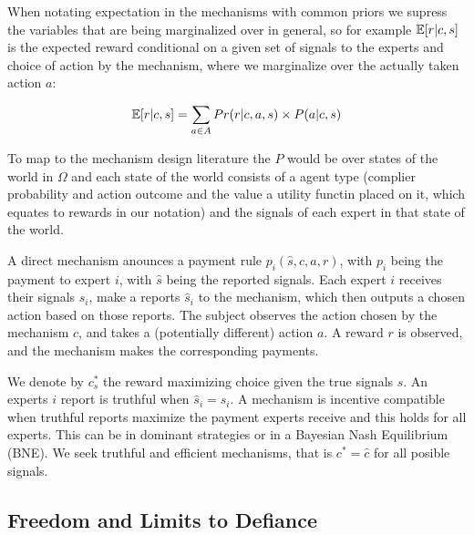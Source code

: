 When notating expectation in the mechanisms with common priors we supress the variables that are being marginalized over in general, so for example $\operatorname*{\mathbb E}[r|c,s]$ is the expected reward conditional on a given set of signals to the experts and choice of action by the mechanism, where we  marginalize over the actually taken action $a$:

\[
\operatorname*{\mathbb E}[r|c,s] = \sum_{a \in A} Pr(r|c,a,s) \times P(a|c,s) 
\]


To map to the mechanism design literature the $P$ would be over states of the world in $\Omega$ and each state of the world consists of a agent type (complier probability and action outcome and the value a utility functin placed on it, which equates to rewards in our notation) and the signals of each expert in that state of the world.



A direct mechanism anounces a payment rule $p_i(\hat{s}, c,a,r)$, with $p_i$ being the payment to expert $i$, with $\hat{s}$ being the reported signals. 
Each expert $i$ receives their signals $s_i$, make a reports $\hat{s}_i$ to the mechanism, which then outputs a chosen action based on those reports.
The subject observes the action chosen by the mechanism $c$, and takes a (potentially different) action $a$. A reward $r$ is observed, and the mechanism makes the corresponding payments.

We denote by $c^{*}_s$ the reward maximizing choice given the true signals $s$.
An experts $i$ report is truthful when $\hat{s}_i=s_i$. A mechanism is incentive compatible when truthful reports maximize the payment experts receive and this holds for all experts. This can be in dominant strategies or in a Bayesian Nash Equilibrium (BNE).  We seek truthful and efficient mechanisms, that is $c^{*} = \hat{c}$ for all posible signals.






\subsection{Freedom and Limits to Defiance}

